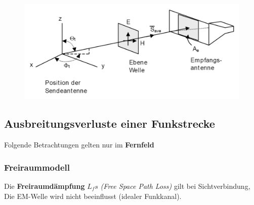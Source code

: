 \documentclass[
  10pt,
  a4paper,
  german]{article}
\numberwithin{equation}{section}
\begin{document}
\begin{figure}[H]

{\centering \includegraphics{images/04_EffektiveAperture.png}

}

\end{figure}

\hypertarget{ausbreitungsverluste-einer-funkstrecke}{%
\subsection{Ausbreitungsverluste einer
Funkstrecke}\label{ausbreitungsverluste-einer-funkstrecke}}

\begin{tcolorbox}[enhanced jigsaw, toptitle=1mm, breakable, colback=white, opacityback=0, colframe=quarto-callout-important-color-frame, bottomrule=.15mm, toprule=.15mm, bottomtitle=1mm, opacitybacktitle=0.6, coltitle=black, leftrule=.75mm, left=2mm, colbacktitle=quarto-callout-important-color!10!white, rightrule=.15mm, titlerule=0mm, title=\textcolor{quarto-callout-important-color}{\faExclamation}\hspace{0.5em}{Wichtig}, arc=.35mm]

Folgende Betrachtungen gelten nur im \textbf{Fernfeld}

\end{tcolorbox}

\hypertarget{freiraummodell}{%
\subsubsection{Freiraummodell}\label{freiraummodell}}

Die \textbf{Freiraumdämpfung} \(L_fs\) \emph{(Free Space Path Loss)}
gilt bei Sichtverbindung, Die EM-Welle wird nicht beeinflusst (idealer
Funkkanal).
\end{document}
